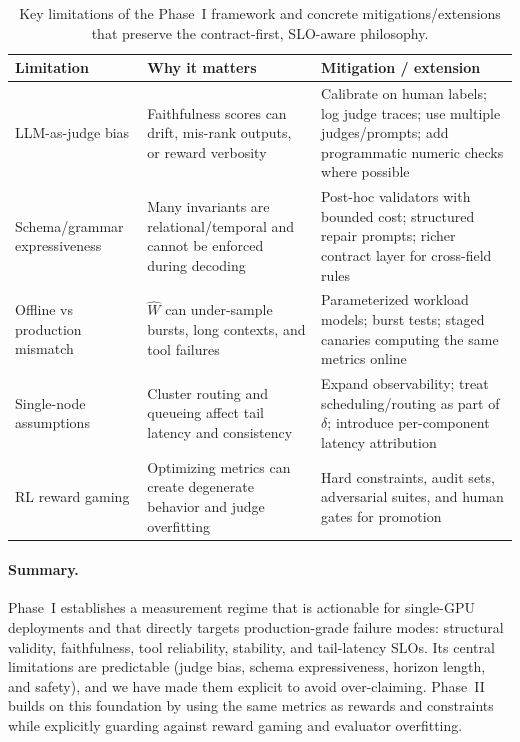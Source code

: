 \documentclass[11pt]{article}
\begin{document}
\begin{table}[t]
\centering
\small
\begin{tabular}{p{3.2cm}p{5.0cm}p{6.8cm}}
\toprule
\textbf{Limitation} & \textbf{Why it matters} & \textbf{Mitigation / extension} \\
\midrule
LLM-as-judge bias & Faithfulness scores can drift, mis-rank outputs, or reward verbosity & Calibrate on human labels; log judge traces; use multiple judges/prompts; add programmatic numeric checks where possible \\
\addlinespace
Schema/grammar expressiveness & Many invariants are relational/temporal and cannot be enforced during decoding & Post-hoc validators with bounded cost; structured repair prompts; richer contract layer for cross-field rules \\
\addlinespace
Offline vs production mismatch & $\widehat{W}$ can under-sample bursts, long contexts, and tool failures & Parameterized workload models; burst tests; staged canaries computing the same metrics online \\
\addlinespace
Single-node assumptions & Cluster routing and queueing affect tail latency and consistency & Expand observability; treat scheduling/routing as part of $\delta$; introduce per-component latency attribution \\
\addlinespace
RL reward gaming & Optimizing metrics can create degenerate behavior and judge overfitting & Hard constraints, audit sets, adversarial suites, and human gates for promotion \\
\bottomrule
\end{tabular}
\caption{Key limitations of the Phase~I framework and concrete mitigations/extensions that preserve the contract-first, SLO-aware philosophy.}
\label{tab:limitations}
\end{table}

\paragraph{Summary.}
Phase~I establishes a measurement regime that is actionable for single-GPU deployments and that directly targets production-grade failure modes: structural validity, faithfulness, tool reliability, stability, and tail-latency SLOs.
Its central limitations are predictable (judge bias, schema expressiveness, horizon length, and safety), and we have made them explicit to avoid over-claiming.
Phase~II builds on this foundation by using the same metrics as rewards and constraints while explicitly guarding against reward gaming and evaluator overfitting.
\end{document}
